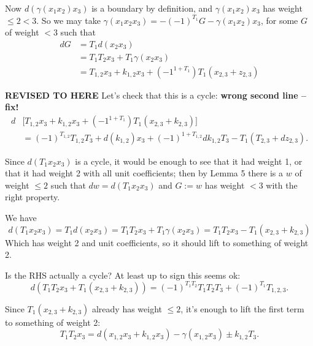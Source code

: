 \documentclass[11pt]{amsart}
\def\g{{\gamma}}
\begin{document}
Now $d(\g(x_1x_2)x_3)$ is a boundary by definition, and $\g(x_{1}x_{2})x_{3}$ has weight $\leq 2<3$. So
we may take
 $\g(x_1x_2x_3) = - (-1)^{T_{1}}G-\g(x_1x_2)x_3$, for some $G$  of weight $<3$ such that
\begin{align*}
 dG &= T_1d(x_2x_3) \\
 &= T_1T_2x_3+T_1\g(x_2x_3)\\
 &= T_{1,2}x_3+k_{1,2}x_3+ (-1^{1+T_1})T_1(x_{2,3}+z_{2,3})
\end{align*}

{\bf REVISED TO HERE}
Let's check that this is a cycle: {\bf wrong second line -- fix!}
\begin{align*}
d&\bigl[T_{1,2} x_3 +k_{1,2}x_3+(-1^{1+T_1})T_1(x_{2,3}+k_{2,3})\bigr]\\
&=(-1)^{T_{1,2}}T_{1,2}T_3 + d(k_{1,2})x_3 + (-1)^{1+T_{1,2}} dk_{1,2}T_3 -T_1(T_{2,3}+dz_{2,3}).
\end{align*}





Since $d(T_1x_2x_3)$ is a cycle, it would be enough to see that it had weight 1, or that it had weight 2 with
all unit coefficients; then by Lemma 5 there is a $w$ of weight 
$\leq 2$ such that $dw = d(T_1x_2x_3)$ and  $G := w$ has weight $<3$ with
the right property.

We have 
$$
d(T_1x_2x_3) = T_1d(x_2x_3) = T_1T_2x_3+T_1\g(x_{2}x_3) = T_1T_2x_3-T_1(x_{2,3}+k_{2,3})
$$
Which has weight 2 and unit coefficients, so it should lift to something
of weight 2.

Is the RHS actually a cycle? At least up to sign this seems ok:
$$
d(T_1T_2x_3+T_1(x_{2,3}+k_{2,3})) = (-1)^{T_1T_2}T_1T_2T_3 + (-1)^{T_1}T_{1,2,3}.
$$

Since $ T_1(x_{2,3}+k_{2,3})$ already has weight $\leq 2$, it's enough to lift the first term to something of weight 2:
$$
T_1T_2x_{3} =  d(x_{1,2}x_{3}+k_{1,2}x_{3})-\g(x_{1,2}x_{3})\pm k_{1,2}T_{3}.
$$
\end{document}

